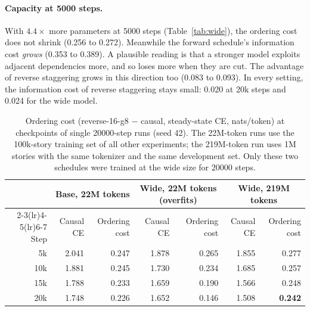 \documentclass[11pt]{article}
\theoremstyle{definition}
\theoremstyle{remark}
\newcommand{\sch}[1]{\textsf{#1}}
\begin{document}
\paragraph{Capacity at 5000 steps.}
With $4.4\times$ more parameters at 5000 steps (Table~\ref{tab:wide}), the ordering cost does not shrink (0.256 to 0.272).
Meanwhile the forward schedule's information cost \emph{grows} (0.353 to 0.389).
A plausible reading is that a stronger model exploits adjacent dependencies more, and so loses more when they are cut.
The advantage of reverse staggering grows in this direction too (0.083 to 0.093).
In every setting, the information cost of reverse staggering stays small: 0.020 at 20k steps and 0.024 for the wide model.

\begin{table}[t]
  \centering
  \caption{Ordering cost (\sch{reverse-16-g8} $-$ \sch{causal}, steady-state CE, nats/token) at checkpoints of single 20000-step runs (seed 42). The 22M-token runs use the 100k-story training set of all other experiments; the 219M-token run uses 1M stories with the same tokenizer and the same development set. Only these two schedules were trained at the wide size for 20000 steps.}
  \label{tab:widelong}
  \small
  \begin{tabular}{rrrrrrr}
    \toprule
    & \multicolumn{2}{c}{Base, 22M tokens} & \multicolumn{2}{c}{Wide, 22M tokens (overfits)} & \multicolumn{2}{c}{Wide, 219M tokens} \\
    \cmidrule(lr){2-3}\cmidrule(lr){4-5}\cmidrule(lr){6-7}
    Step & Causal CE & Ordering cost & Causal CE & Ordering cost & Causal CE & Ordering cost \\
    \midrule
    5k  & 2.041 & 0.247 & 1.878 & 0.265 & 1.855 & 0.277 \\
    10k & 1.881 & 0.245 & 1.730 & 0.234 & 1.685 & 0.257 \\
    15k & 1.788 & 0.233 & 1.659 & 0.190 & 1.566 & 0.248 \\
    20k & 1.748 & 0.226 & 1.652 & 0.146 & 1.508 & \textbf{0.242} \\
    \bottomrule
  \end{tabular}
\end{table}
\end{document}

